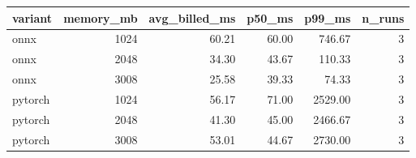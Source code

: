 \begin{tabular}{lrrrrr}
\toprule
variant & memory\_mb & avg\_billed\_ms & p50\_ms & p99\_ms & n\_runs \\
\midrule
onnx & 1024 & 60.21 & 60.00 & 746.67 & 3 \\
onnx & 2048 & 34.30 & 43.67 & 110.33 & 3 \\
onnx & 3008 & 25.58 & 39.33 & 74.33 & 3 \\
pytorch & 1024 & 56.17 & 71.00 & 2529.00 & 3 \\
pytorch & 2048 & 41.30 & 45.00 & 2466.67 & 3 \\
pytorch & 3008 & 53.01 & 44.67 & 2730.00 & 3 \\
\bottomrule
\end{tabular}
